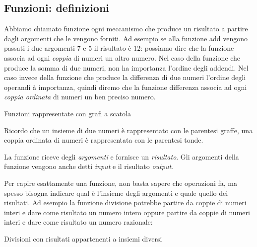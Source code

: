 \subsection{Funzioni: definizioni}
\label{subsec:fun_definizioni}

Abbiamo chiamato funzione ogni meccanismo che produce un risultato a partire 
dagli argomenti che le vengono forniti.
Ad esempio se alla funzione add vengono passati i due argomenti \(7\) e \(5\) 
il risultato è \(12\): possiamo dire che la funzione associa ad ogni 
\emph{coppia} di numeri un altro numero.
Nel caso della funzione che produce la somma di due numeri, non ha importanza 
l'ordine degli addendi.
Nel caso invece della funzione che produce la differenza di due numeri 
l'ordine degli operandi à importanza, quindi diremo che la funzione 
differenza associa ad ogni \emph{coppia ordinata} di numeri un ben preciso 
numero.

\begin{center}
Funzioni rappresentate con grafi a scatola\\[1em]
\begin{inaccessibleblock}
\grafifunzbinarie %
\end{inaccessibleblock}
\end{center}

Ricordo che un insieme di due numeri è rappresentato con le parentesi graffe, 
una coppia ordinata di numeri è rappresentata con le parentesi tonde.

La funzione riceve degli \emph{argomenti} e fornisce un \emph{risultato}.
Gli argomenti della funzione vengono anche detti \emph{input} e il risultato 
\emph{output}.

Per capire esattamente una funzione, non basta sapere che operazioni fa, ma 
spesso bisogna indicare qual è l'insieme degli argomenti e quale quello dei 
risultati. Ad esempio la funzione divisione potrebbe partire da coppie di 
numeri interi e dare come risultato un numero intero oppure partire da coppie 
di numeri interi e dare come risultato un numero razionale:

\begin{center}
Divisioni con risultati appartenenti a insiemi diversi\\[1em]
\begin{inaccessibleblock}
\grafidivisione %
\end{inaccessibleblock}
\end{center}

